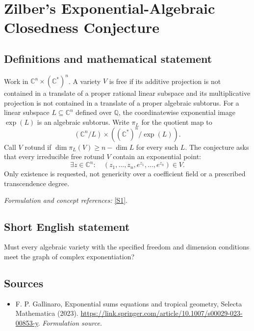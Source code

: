 \documentclass[11pt]{article}
\begin{document}
\section*{\texorpdfstring{Zilber's Exponential-Algebraic Closedness Conjecture}{Zilber's Exponential-Algebraic Closedness Conjecture}}\label{441}
\subsection{Definitions and mathematical statement}
Work in ${\mathbb{C}}^n\times({\mathbb{C}}^*)^n$. A variety $V$ is free if its additive projection is not contained in a translate of a proper rational linear subspace and its multiplicative projection is not contained in a translate of a proper algebraic subtorus. For a linear subspace $L\subseteq{\mathbb{C}}^n$ defined over ${\mathbb{Q}}$, the coordinatewise exponential image $\exp(L)$ is an algebraic subtorus. Write $\pi_L$ for the quotient map to
\[
 ({\mathbb{C}}^n/L)\times(({\mathbb{C}}^*)^n/\exp(L)).
\]
Call $V$ rotund if $\dim\pi_L(V)\ge n-\dim L$ for every such $L$. The conjecture asks that every irreducible free rotund $V$ contain an exponential point:
\[
 \exists z\in{\mathbb{C}}^n:\quad (z_1,\ldots,z_n,e^{z_1},\ldots,e^{z_n})\in V.
\]
Only existence is requested, not genericity over a coefficient field or a prescribed transcendence degree.
\par\smallskip\textit{Formulation and concept references:} \href{https://link.springer.com/article/10.1007/s00029-023-00853-y}{[S1]}.

\subsection{Short English statement}
Must every algebraic variety with the specified freedom and dimension conditions meet the graph of complex exponentiation?
\subsection{Sources}
\begin{itemize}
\item[S1]F. P. Gallinaro, Exponential sums equations and tropical geometry, Selecta Mathematica (2023).
\url{https://link.springer.com/article/10.1007/s00029-023-00853-y}.
\textit{Formulation source.}
\end{itemize}
\end{document}
